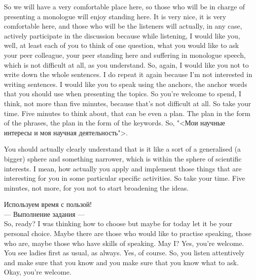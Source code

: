 \documentclass[main.tex]{subfiles}
\begin{document}
So we will have a very comfortable place here, so those who will be in charge of presenting a monologue will enjoy standing here.
It is very nice, it is very comfortable here, and those who will be the listeners will actually, in any case, actively participate in the discussion because while listening, I would like you, well, at least each of you to think of one question, what you would like to ask your peer colleague, your peer standing here and suffering in monologue speech, which is not difficult at all, as you understand.
So, again, I would like you not to write down the whole sentences.
I do repeat it again because I'm not interested in writing sentences.
I would like you to speak using the anchors, the anchor words that you should use when presenting the topics.
So you're welcome to spend, I think, not more than five minutes, because that's not difficult at all.
So take your time.
Five minutes to think about, that can be even a plan.
The plan in the form of the phrases, the plan in the form of the keywords.
So, "<Мои научные интересы и моя научная деятельность">.

You should actually clearly understand that is it like a sort of a generalised (a bigger) sphere and something narrower, which is within the sphere of scientific interests.
I mean, how actually you apply and implement those things that are interesting for you in some particular specific activities.
So take your time.
Five minutes, not more, for you not to start broadening the ideas.

Используем время с пользой!
\\

--- Выполнение задания ---
\\

So, ready?
I was thinking how to choose but maybe for today let it be your personal choice.
Maybe there are those who would like to practise speaking, those who are, maybe those who have skills of speaking.
May I?
Yes, you're welcome.
You see ladies first as usual, as always.
Yes, of course.
So, you listen attentively and make sure that you know and you make sure that you know what to ask.
Okay, you're welcome.

\newpage
{}
\end{document}
